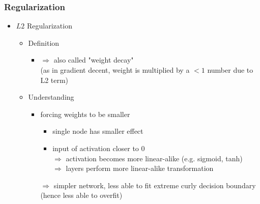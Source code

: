 \subsubsection{Regularization}
\begin{itemize}
\item $L2$ Regularization
	\begin{itemize}
	\item Definition
		\begin{itemize}
		\item $\Rightarrow$ also called "weight decay" \\
		(as in gradient decent, weight is multiplied by a $<1$ number due to L2 term)
		\end{itemize}
	\item Understanding
		\begin{itemize}
		\item forcing weights to be smaller
			\begin{itemize}
			\item single node has smaller effect
			\item input of activation closer to $0$ \\
			$\Rightarrow$ activation becomes more linear-alike (e.g. sigmoid, tanh) \\
			$\Rightarrow$ layers perform more linear-alike transformation
			\end{itemize}
		$\Rightarrow$ simpler network, less able to fit extreme curly decision boundary \\
		(hence less able to overfit)

		\end{itemize}
	\end{itemize}
	

\end{itemize}

